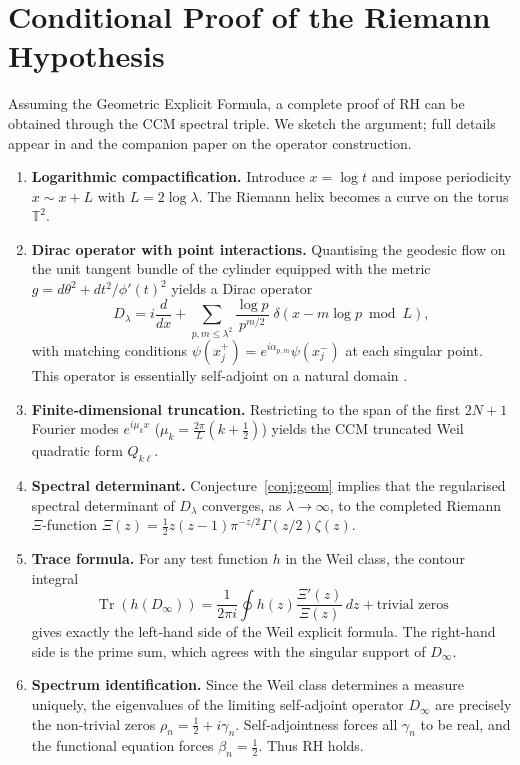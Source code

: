 \documentclass[11pt,a4paper]{article}
\begin{document}
\section{Conditional Proof of the Riemann Hypothesis}\label{sec:conditional}

Assuming the Geometric Explicit Formula, a complete proof of RH can be obtained through the CCM spectral triple.  We sketch the argument; full details appear in \cite{CCM} and the companion paper on the operator construction.

\begin{enumerate}
\item \textbf{Logarithmic compactification.}  Introduce \(x = \log t\) and impose periodicity \(x \sim x + L\) with \(L = 2\log\lambda\).  The Riemann helix becomes a curve on the torus \(\mathbb{T}^2\).
\item \textbf{Dirac operator with point interactions.}  Quantising the geodesic flow on the unit tangent bundle of the cylinder equipped with the metric \(g = d\theta^2 + dt^2/\phi'(t)^2\) yields a Dirac operator
\[
D_\lambda = i\frac{d}{dx} + \sum_{p,m\le\lambda^2} \frac{\log p}{p^{m/2}} \;\delta(x - m\log p \bmod L),
\]
with matching conditions \(\psi(x_j^+) = e^{i\alpha_{p,m}}\psi(x_j^-)\) at each singular point.  This operator is essentially self‑adjoint on a natural domain \cite{Albeverio}.
\item \textbf{Finite‑dimensional truncation.}  Restricting to the span of the first \(2N+1\) Fourier modes \(e^{i\mu_k x}\) (\(\mu_k = \frac{2\pi}{L}(k+\frac12)\)) yields the CCM truncated Weil quadratic form \(Q_{k\ell}\).
\item \textbf{Spectral determinant.}  Conjecture~\ref{conj:geom} implies that the regularised spectral determinant of \(D_\lambda\) converges, as \(\lambda\to\infty\), to the completed Riemann \(\Xi\)-function \(\Xi(z) = \frac12 z(z-1)\pi^{-z/2}\Gamma(z/2)\zeta(z)\).
\item \textbf{Trace formula.}  For any test function \(h\) in the Weil class, the contour integral
\[
\operatorname{Tr}(h(D_\infty)) = \frac{1}{2\pi i} \oint h(z) \frac{\Xi'(z)}{\Xi(z)} \,dz + \text{trivial zeros}
\]
gives exactly the left‑hand side of the Weil explicit formula.  The right‑hand side is the prime sum, which agrees with the singular support of \(D_\infty\).
\item \textbf{Spectrum identification.}  Since the Weil class determines a measure uniquely, the eigenvalues of the limiting self‑adjoint operator \(D_\infty\) are precisely the non‑trivial zeros \(\rho_n = \frac12 + i\gamma_n\).  Self‑adjointness forces all \(\gamma_n\) to be real, and the functional equation forces \(\beta_n = \frac12\).  Thus RH holds.
\end{enumerate}
\end{document}
